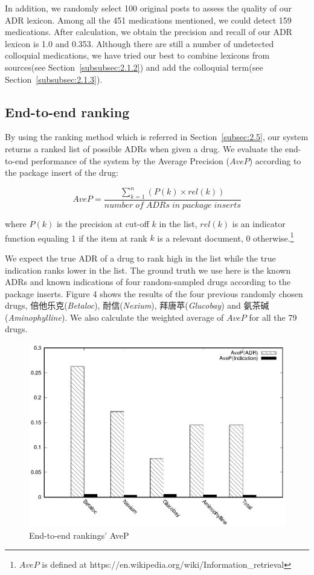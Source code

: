 In addition, we randomly select 100 original posts to assess the 
quality of our ADR lexicon. Among all the 451 medications mentioned, 
we could detect 159 medications. After calculation, we obtain the precision 
and recall of our ADR lexicon is 1.0 and 0.353. Although there are still 
a number of undetected colloquial medications, we have tried our best 
to combine lexicons from sources(see Section~\ref{subsubsec:2.1.2}) and add 
the colloquial term(see Section~\ref{subsubsec:2.1.3}).  

\subsection{End-to-end ranking}
By using the ranking method which is referred in Section~\ref{subsec:2.5}, our system returns a ranked list of possible ADRs when given a drug. We evaluate the end-to-end performance of the system by the Average Precision ($AveP$) according to the package insert of the drug:

\begin{equation}
\label{equ:1}
	AveP = \frac{\sum_{k=1}^n (P(k)\times rel(k))}{number\;of\;ADRs\;in\;package\;inserts}
\end{equation}

where $P(k)$ is the precision at cut-off $k$ in the list, $rel(k)$ is an indicator function equaling 1 if the item at rank $k$ is a relevant document, 0 otherwise.\footnote{$AveP$ is defined at https://en.wikipedia.org/wiki/Information\_retrieval}

We expect the true ADR of a drug to rank high in the list while the true indication ranks lower in the list. The ground truth we use here is the known ADRs and known indications of four random-sampled drugs according to the package inserts. Figure 4 shows the results of the four previous randomly chosen drugs, 倍他乐克(\textit{Betaloc}), 耐信(\textit{Nexium}), 拜唐苹(\textit{Glucobay}) and 氨茶碱(\textit{Aminophylline}). We also calculate the weighted average of $AveP$ for all the 79 drugs.

\begin{figure}
	\centering
	\includegraphics[width=0.6\columnwidth]{Fig4.eps}
	\caption{End-to-end rankings’ AveP}
	\label{fig:4}       %
\end{figure}

